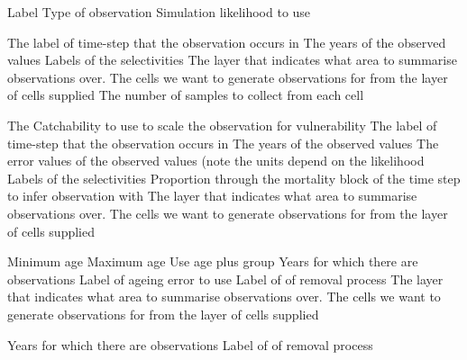 \par\par
{} {Label}
 {Type of observation}
 {Simulation likelihood to use}
\par\textbf{}\par
{} {The label of time-step that the observation occurs in}
 {The years of the observed values}
 {Labels of the selectivities}
 {The layer that indicates what area to summarise observations over.}
 {The cells we want to generate observations for from the layer of cells supplied}
 {The number of samples to collect from each cell}
\par\textbf{}\par
{} {The Catchability to use to scale the observation for vulnerability}
 {The label of time-step that the observation occurs in}
 {The years of the observed values}
 {The error values of the observed values (note the units depend on the likelihood}
 {Labels of the selectivities}
 {Proportion through the mortality block of the time step to infer observation with}
 {The layer that indicates what area to summarise observations over.}
 {The cells we want to generate observations for from the layer of cells supplied}
\par\textbf{}\par
{} {Minimum age}
 {Maximum age}
 {Use age plus group}
 {Years for which there are observations}
 {Label of ageing error to use}
 {Label of of removal process}
 {The layer that indicates what area to summarise observations over.}
 {The cells we want to generate observations for from the layer of cells supplied}
\par\textbf{}\par
{} {Years for which there are observations}
 {Label of of removal process}
